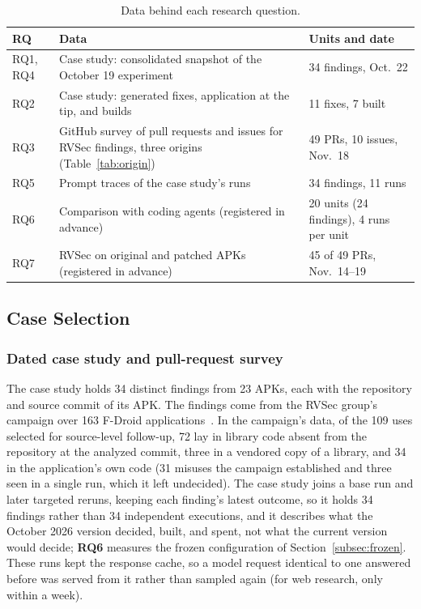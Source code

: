 \documentclass[conference]{IEEEtran}
\newcommand{\researchq}[1]{\textbf{RQ#1}}
\begin{document}
\begin{table}[H]
\centering
\caption{Data behind each research question.}
\label{tab:rq-data}
\footnotesize
\begin{tabular}{p{0.9cm}p{3.7cm}p{2.6cm}}
\toprule
RQ & Data & Units and date \\
\midrule
RQ1, RQ4 & Case study: consolidated snapshot of the October 19 experiment & 34 findings, Oct.~22 \\
RQ2 & Case study: generated fixes, application at the tip, and builds & 11 fixes, 7 built \\
RQ3 & GitHub survey of pull requests and issues for RVSec findings, three origins (Table~\ref{tab:origin}) & 49 PRs, 10 issues, Nov.~18 \\
RQ5 & Prompt traces of the case study's runs & 34 findings, 11 runs \\
RQ6 & Comparison with coding agents (registered in advance) & 20 units (24 findings), 4 runs per unit \\
RQ7 & RVSec on original and patched APKs (registered in advance) & 45 of 49 PRs, Nov.~14--19 \\
\bottomrule
\end{tabular}
\end{table}

\subsection{Case Selection}
\label{subsec:selection}

\subsubsection{Dated case study and pull-request survey}

The case study holds 34 distinct findings from 23 APKs, each with the
repository and source commit of its APK. The findings come from the RVSec
group's campaign over 163 F-Droid applications~\cite{costa2026effectiveness}.
In the campaign's data, of the 109 uses selected for source-level follow-up, 72 lay in library
code absent from the repository at the analyzed commit, three in a vendored
copy of a library, and 34 in the application's own code (31 misuses the
campaign established and three seen in a single run, which it left undecided). The case study joins a base run and later
targeted reruns, keeping each finding's latest outcome, so it holds 34
findings rather than 34 independent executions, and it describes what the
October 2026 version decided, built, and spent, not what the current version
would decide; \researchq{6} measures the frozen configuration of
Section~\ref{subsec:frozen}. These runs kept the response cache, so a model
request identical to one answered before was served from it rather than
sampled again (for web research, only within a week).
\end{document}
